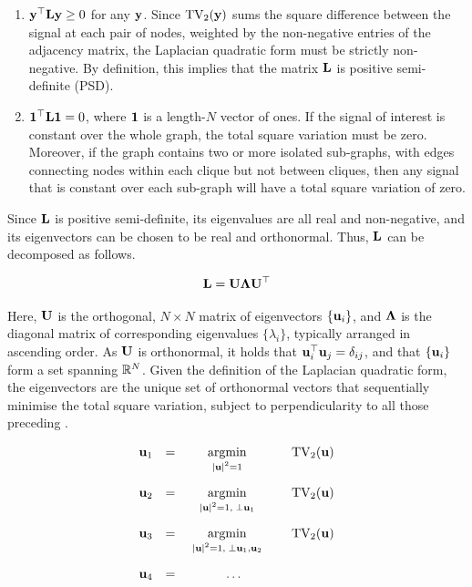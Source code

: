 \begin{enumerate}
    \item $\mathbf{y}^\top \mathbf{L} \mathbf{y} \geq 0$ for any $\mathbf{y}$. Since $\text{TV}_2(\mathbf{y})$ sums the square difference between the signal at each pair of nodes, weighted by the non-negative entries of the adjacency matrix, the Laplacian quadratic form must be strictly non-negative. By definition, this implies that the matrix $\mathbf{L}$ is positive semi-definite (PSD). 
    \item $\mathbf{1}^\top \mathbf{L} \mathbf{1} = 0$, where $\mathbf{1}$ is a length-$N$ vector of ones. If the signal of interest is constant over the whole graph, the total square variation must be zero. Moreover, if the graph contains two or more isolated sub-graphs, with edges connecting nodes within each clique but not between cliques, then any signal that is constant over each sub-graph will have a total square variation of zero. 
\end{enumerate}

Since $\mathbf{L}$ is positive semi-definite, its eigenvalues are all real and non-negative, and its eigenvectors can be chosen to be real and orthonormal. Thus, $\mathbf{L}$ can be decomposed as follows. 

\begin{equation}
    \mathbf{L} = \mathbf{U} \mathbf{\Lambda} \mathbf{U}^\top
\end{equation}

Here, $\mathbf{U}$ is the orthogonal, $N \times N$ matrix of eigenvectors $\{\mathbf{u}_i\}$, and $\mathbf{\Lambda}$ is the diagonal matrix of corresponding eigenvalues $\{\lambda_i\}$, typically arranged in ascending order. As $\mathbf{U}$ is orthonormal, it holds that $\mathbf{u}_i^\top \mathbf{u}_j = \delta_{ij}$, and that $\{\mathbf{u}_i\}$ form a set spanning $\mathbb{R}^N$. Given the definition of the Laplacian quadratic form, the eigenvectors are the unique set of orthonormal vectors that sequentially minimise the total square variation, subject to perpendicularity to all those preceding \citep{Spielman2019}.


$$
\begin{matrix}
    \uu_1 & = & \underset{\raisebox{-0.1cm} { $ \scriptstyle |\uu|^2 = 1$ }}{\text{argmin}} \quad & \text{TV}_2(\uu) \\[0.7cm]
    \uu_2 & = & \underset{\raisebox{-0.1cm} { $ \scriptstyle |\uu|^2 = 1, \; \perp \uu_1$ }}{\text{argmin}} \quad & \text{TV}_2(\uu) \\[0.7cm]
    \uu_3 & = & \underset{\raisebox{-0.1cm} { $ \scriptstyle |\uu|^2 = 1, \;\perp \uu_1, \uu_2$ }}{\text{argmin}} \quad & \text{TV}_2(\uu) \\[0.7cm]
    \uu_4 & = & \ldots
\end{matrix}
$$

